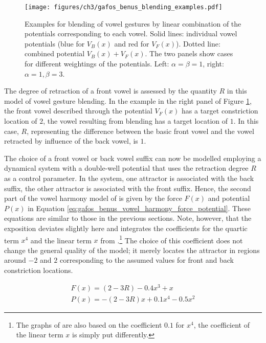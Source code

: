 \begin{figure}[t]
	\texttt{[image: figures/ch3/gafos\_benus\_blending\_examples.pdf]}
	\caption[Examples for blending of vowel gestures by linear combination of the potentials corresponding to each vowel in the model of \citet{GafosBenus2006}.]{Examples for blending of vowel gestures by linear combination of the potentials corresponding to each vowel. Solid lines: individual vowel potentials (blue for $V_B(x)$ and red for $V_F(x)$). Dotted line: combined potential $V_B(x) + V_F(x)$. The two panels show cases for different weightings of the potentials. Left: $\alpha = \beta = 1$, right: $\alpha = 1, \beta = 3$.}
	\label{fig:gafos_benus_blending_examples}
\end{figure}

The degree of retraction of a front vowel is assessed by the quantity $R$ in this model of vowel gesture blending. In the example in the right panel of Figure \ref{fig:gafos_benus_blending_examples}, the front vowel described through the potential $V_F(x)$ has a target constriction location of $2$, the vowel resulting from blending has a target location of $1$. In this case, $R$, representing the difference between the basic front vowel and the vowel retracted by influence of the back vowel, is $1$.

The choice of a front vowel or back vowel suffix can now be modelled employing a dynamical system with a double-well potential that uses the retraction degree $R$ as a control parameter. In the system, one attractor is associated with the back suffix, the other attractor is associated with the front suffix. Hence, the second part of the vowel harmony model of \citet{GafosBenus2006} is given by the force $F(x)$ and potential $P(x)$ in Equation \ref{eq:gafos_benus_vowel_harmony_force_potential}. These equations are similar to those in the previous sections. Note, however, that the exposition deviates slightly here and integrates the coefficients for the quartic term $x^4$ and the linear term $x$ from \citet[][262, footnote 85]{Benus2005}.\footnote{The graphs of \citet{GafosBenus2006} are also based on the coefficient $0.1$ for $x^4$, the coefficient of the linear term $x$ is simply put differently.} The choice of this coefficient does not change the general quality of the model; it merely locates the attractor in regions around $-2$ and $2$ corresponding to the assumed values for front and back constriction locations.

\begin{equation}
\begin{split}
F(x) = (2-3R) - 0.4 x^3 + x\\
P(x) = -(2-3R)x + 0.1 x^4 - 0.5 x^2
\end{split}
\label{eq:gafos_benus_vowel_harmony_force_potential}
\end{equation}

